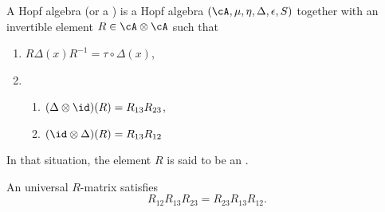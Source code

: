 \begin{definition}
	A  Hopf algebra (or a ) is a Hopf algebra $(\cA,\mu,\eta,\Delta,\epsilon,S)$ together with an invertible element $R\in\cA\otimes\cA$ such that
	\begin{enumerate}
		\item $R\Delta(x)R^{-1}=\tau\circ\Delta(x)$,\label{ItemCondUnifRi}
		\item
		      \begin{enumerate}
			      \item $(\Delta\otimes\id)(R)=R_{13}R_{23}$,
			      \item $(\id\otimes\Delta)(R)=R_{13}R_{12}$\label{ItemCondUnifRiib}
		      \end{enumerate}

	\end{enumerate}
	In that situation, the element $R$ is said to be an .
\end{definition}


\begin{theorem}
	An universal $R$-matrix satisfies
	\begin{equation}
		R_{12}R_{13}R_{23}=R_{23}R_{13}R_{12}.
	\end{equation}

\end{theorem}


